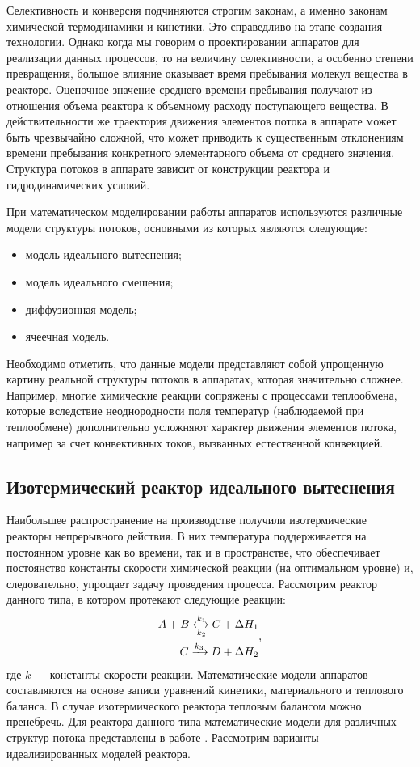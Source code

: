 Селективность и конверсия подчиняются строгим законам, а именно законам химической термодинамики и кинетики. Это справедливо на этапе создания технологии. Однако когда мы говорим о проектировании аппаратов для реализации данных процессов, то на величину селективности, а особенно степени превращения, большое влияние оказывает время пребывания молекул вещества в реакторе. Оценочное значение среднего времени пребывания получают из отношения объема реактора к объемному расходу поступающего вещества. В действительности же траектория движения элементов потока в аппарате может быть чрезвычайно сложной, что может приводить к существенным отклонениям времени пребывания конкретного элементарного объема от среднего значения. Структура потоков в аппарате зависит от конструкции реактора и гидродинамических условий. 

При математическом моделировании работы аппаратов используются различные модели структуры потоков, основными из которых являются следующие: 
\begin{itemize}
\item модель идеального вытеснения;
\item модель идеального смешения;
\item диффузионная модель;
\item ячеечная модель.
\end{itemize}

Необходимо отметить, что данные модели представляют собой упрощенную картину реальной структуры потоков в аппаратах, которая значительно сложнее. Например, многие химические реакции сопряжены с процессами теплообмена, которые вследствие неоднородности поля температур (наблюдаемой при теплообмене) дополнительно усложняют характер движения элементов потока, например за счет конвективных токов, вызванных естественной конвекцией.

\subsection*{Изотермический реактор идеального вытеснения}
Наибольшее распространение на производстве получили изотермические реакторы непрерывного действия. В них температура поддерживается на постоянном уровне как во времени, так и в пространстве, что обеспечивает постоянство константы скорости химической реакции (на оптимальном уровне) и, следовательно, упрощает задачу проведения процесса. Рассмотрим реактор данного типа, в котором протекают следующие реакции:
\begin{equation*} 
\begin{aligned} 
A+B \xleftrightarrow[k_2]{k_1} C + \Delta H_1\\
C \xrightarrow{k_3} D + \Delta H_2
\end{aligned} ,
\end{equation*}
где $k$ --- константы скорости реакции.
Математические модели аппаратов составляются на основе записи уравнений кинетики, материального и теплового баланса. В случае изотермического реактора тепловым балансом можно пренебречь. Для реактора данного типа математические модели для различных структур потока представлены в работе \cite{klinov-mm2009}. Рассмотрим варианты идеализированных моделей реактора.

